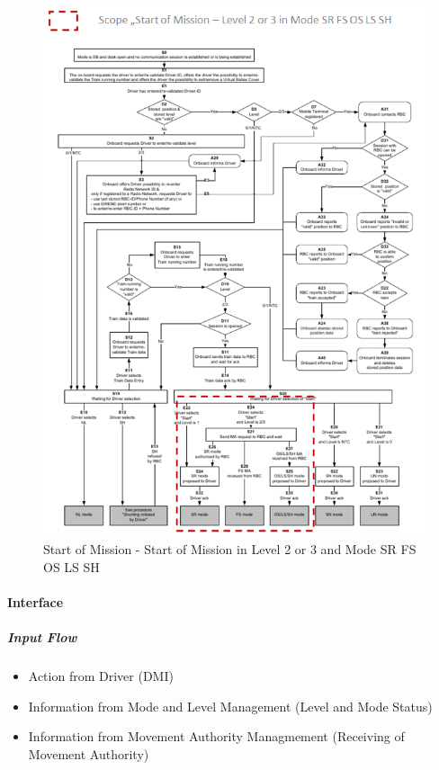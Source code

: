 \begin{figure}
\centering
\includegraphics[scale=0.7]{images/SoMLevel2_3_SR_FS_OS_LS_SH}
\caption{Start of Mission - Start of Mission in Level 2 or 3 and Mode SR FS OS LS SH}
\label{Start of Mission - Start of Mission in Level 2 or 3 and Mode SR FS OS LS SH}
\end{figure}


\paragraph{Interface}
\subparagraph{Input Flow}
\begin{itemize}
\item Action from Driver (DMI)
\item Information from Mode and Level Management (Level and Mode Status)
\item Information from Movement Authority Managmement (Receiving of Movement Authority)
\end{itemize}

